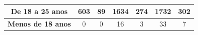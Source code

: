 \begin{table}[H]
{\begin{tabular}{c|cc|cc|cc|}
\multicolumn{1}{|c|}{\cellcolor[HTML]{C0C0C0}\textbf{De 18 a 25 anos}}  & \multicolumn{1}{c|}{603}                                     & 89                                        & \multicolumn{1}{c|}{1634}                                    & 274                                       & \multicolumn{1}{c|}{1732}                                    & 302                                       \\ \hline
\multicolumn{1}{|c|}{\cellcolor[HTML]{C0C0C0}\textbf{Menos de 18 anos}} & \multicolumn{1}{c|}{0}                                       & 0                                         & \multicolumn{1}{c|}{16}                                      & 3                                         & \multicolumn{1}{c|}{33}                                      & 7                                         \\ \hline
\end{tabular}%
}
\end{table}

